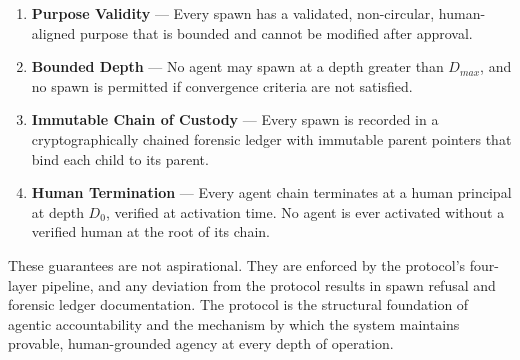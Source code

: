 \begin{enumerate}
    \item \textbf{Purpose Validity} — Every spawn has a validated, non-circular, human-aligned purpose that is bounded and cannot be modified after approval.
    \item \textbf{Bounded Depth} — No agent may spawn at a depth greater than $D_{max}$, and no spawn is permitted if convergence criteria are not satisfied.
    \item \textbf{Immutable Chain of Custody} — Every spawn is recorded in a cryptographically chained forensic ledger with immutable parent pointers that bind each child to its parent.
    \item \textbf{Human Termination} — Every agent chain terminates at a human principal at depth $D_0$, verified at activation time. No agent is ever activated without a verified human at the root of its chain.
\end{enumerate}

These guarantees are not aspirational. They are enforced by the protocol's four-layer pipeline, and any deviation from the protocol results in spawn refusal and forensic ledger documentation. The protocol is the structural foundation of agentic accountability and the mechanism by which the system maintains provable, human-grounded agency at every depth of operation.